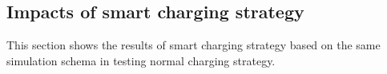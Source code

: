 \documentclass[12pt,a4paper]{report}
\begin{document}


            \subsection{Impacts of smart charging strategy}
            This section shows the results of smart charging strategy based on the same simulation schema in testing normal charging strategy.
\end{document}
